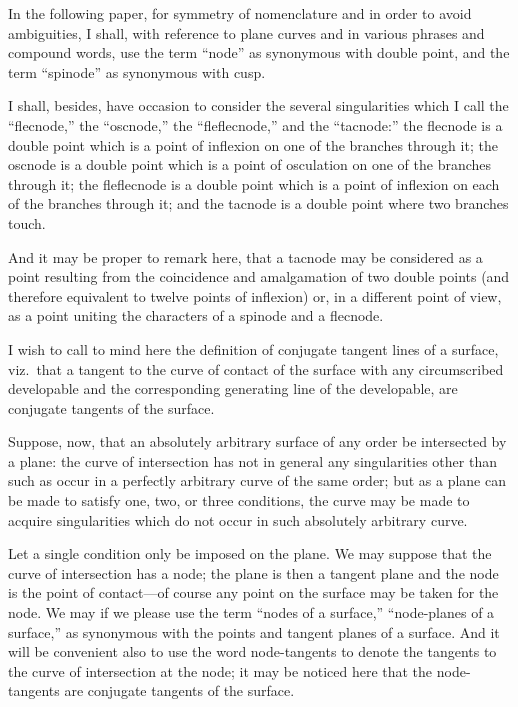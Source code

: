 \documentclass[11pt,a4paper]{article}
\theoremstyle{plain}
\begin{document}
\bigskip

In the following paper, for symmetry of nomenclature and in order to avoid ambiguities, I shall, with reference to plane curves and in various phrases and compound words, use the term ``node'' as synonymous with double point, and the term ``spinode'' as synonymous with cusp.

I shall, besides, have occasion to consider the several singularities which I call the ``flecnode,'' the ``oscnode,'' the ``fleflecnode,'' and the ``tacnode:'' the flecnode is a double point which is a point of inflexion on one of the branches through it; the oscnode is a double point which is a point of osculation on one of the branches through it; the fleflecnode is a double point which is a point of inflexion on each of the branches through it; and the tacnode is a double point where two branches touch.

And it may be proper to remark here, that a tacnode may be considered as a point resulting from the coincidence and amalgamation of two double points (and therefore equivalent to twelve points of inflexion) or, in a different point of view, as a point uniting the characters of a spinode and a flecnode.

I wish to call to mind here the definition of conjugate tangent lines of a surface, viz.\ that a tangent to the curve of contact of the surface with any circumscribed developable and the corresponding generating line of the developable, are conjugate tangents of the surface.

Suppose, now, that an absolutely arbitrary surface of any order be intersected by a plane: the curve of intersection has not in general any singularities other than such as occur in a perfectly arbitrary curve of the same order; but as a plane can be made to satisfy one, two, or three conditions, the curve may be made to acquire singularities which do not occur in such absolutely arbitrary curve.

Let a single condition only be imposed on the plane. We may suppose that the curve of intersection has a node; the plane is then a tangent plane and the node is the point of contact---of course any point on the surface may be taken for the node. We may if we please use the term ``nodes of a surface,'' ``node-planes of a surface,'' as synonymous with the points and tangent planes of a surface. And it will be convenient also to use the word node-tangents to denote the tangents to the curve of intersection at the node; it may be noticed here that the node-tangents are conjugate tangents of the surface.
\end{document}
